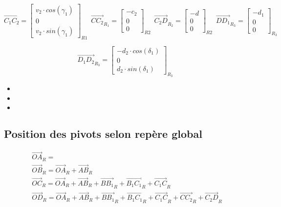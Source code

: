 \documentclass[12pt,a4paper]{article}
\begin{document}
\begin{equation}
\vec{C_1 C_2}=
\begin{bmatrix}
v_2\cdot cos(\gamma_1) \\
0\\
v_2 \cdot sin(\gamma_1)
\end{bmatrix}_{R1} \enspace
\vec{C C_2}_{R_{1}}=
\begin{bmatrix}
-c_2\\
0\\
0
\end{bmatrix}_{R2} \enspace
\vec{C_2 D}_{R_2}=
\begin{bmatrix}
-d\\
0\\
0
\end{bmatrix}_{R2} \enspace
\vec{D D_1}_{R_3}=
\begin{bmatrix}
- d_1\\
0\\
0
\end{bmatrix}_{R_3} \enspace
\end{equation}

\begin{equation}
\vec{D_1 D_2}_{R_3}=
\begin{bmatrix}
-d_2 \cdot cos(\delta_1)\\
0\\
d_2 \cdot sin(\delta_1)
\end{bmatrix}_{R_3} \enspace
\end{equation}

\begin{itemize}
	\item
	\item 
	\item 
\end{itemize}


\medbreak

\medbreak

\medbreak

\medbreak


\subsection{Position des pivots selon repère global}
\begin{eqnarray}
\vec{OA}_R=\\
\vec{OB}_R=\vec{OA}_R+\vec{AB}_R\\
\vec{OC}_R=\vec{OA}_R+\vec{AB}_R+\vec{B B_1}_R+\vec{B_1 C_1}_R+\vec{C_1 C}_R\\
\vec{OD}_R=\vec{OA}_R+\vec{AB}_R+\vec{B B_1}_R+\vec{B_1 C_1}_R+\vec{C_1 C}_R+\vec{C C_2}_R+\vec{C_2 D}_R
\end{eqnarray}
\end{document}
